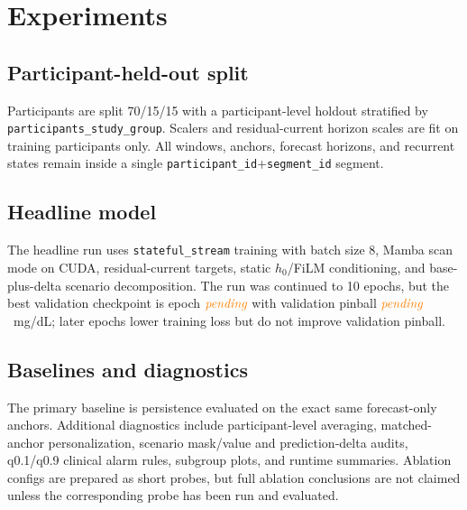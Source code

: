 \section{Experiments}
\label{sec:experiments}

\subsection{Participant-held-out split}
Participants are split 70/15/15 with a participant-level holdout stratified by \texttt{participants\_study\_group}. Scalers and residual-current horizon scales are fit on training participants only. All windows, anchors, forecast horizons, and recurrent states remain inside a single \texttt{participant\_id}+\texttt{segment\_id} segment.

\subsection{Headline model}
The headline run uses \texttt{stateful\_stream} training with batch size 8, Mamba scan mode on CUDA, residual-current targets, static $h_0$/FiLM conditioning, and base-plus-delta scenario decomposition. The run was continued to 10 epochs, but the best validation checkpoint is epoch $\textcolor{orange}{\textit{pending}}$ with validation pinball $\textcolor{orange}{\textit{pending}}$~mg/dL; later epochs lower training loss but do not improve validation pinball.

\subsection{Baselines and diagnostics}
The primary baseline is persistence evaluated on the exact same forecast-only anchors. Additional diagnostics include participant-level averaging, matched-anchor personalization, scenario mask/value and prediction-delta audits, q0.1/q0.9 clinical alarm rules, subgroup plots, and runtime summaries. Ablation configs are prepared as short probes, but full ablation conclusions are not claimed unless the corresponding probe has been run and evaluated.
